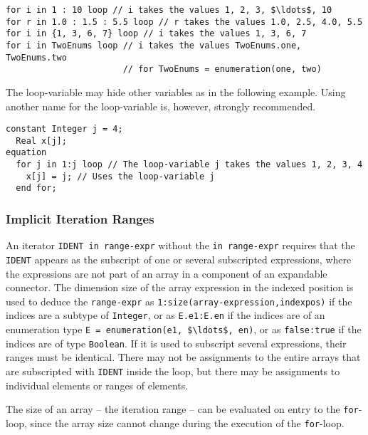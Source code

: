 \begin{example}
\begin{lstlisting}[language=modelica]
for i in 1 : 10 loop // i takes the values 1, 2, 3, $\ldots$, 10
for r in 1.0 : 1.5 : 5.5 loop // r takes the values 1.0, 2.5, 4.0, 5.5
for i in {1, 3, 6, 7} loop // i takes the values 1, 3, 6, 7
for i in TwoEnums loop // i takes the values TwoEnums.one, TwoEnums.two
                       // for TwoEnums = enumeration(one, two)
\end{lstlisting}
The loop-variable may hide other variables as in the following example.
Using another name for the loop-variable is, however, strongly recommended.
\begin{lstlisting}[language=modelica]
  constant Integer j = 4;
  Real x[j];
equation
  for j in 1:j loop // The loop-variable j takes the values 1, 2, 3, 4
    x[j] = j; // Uses the loop-variable j
  end for;
\end{lstlisting}
\end{example}

\subsubsection{Implicit Iteration Ranges}\label{implicit-iteration-ranges}

An iterator \lstinline!IDENT in range-expr! without the \lstinline!in range-expr! requires that the \lstinline!IDENT! appears as the subscript of one or several subscripted expressions, where the expressions are not part of an array in a component of an expandable connector.
The dimension size of the array expression in the indexed position is used to deduce the \lstinline!range-expr! as \lstinline!1:size(array-expression,indexpos)! if the indices are a subtype of \lstinline!Integer!, or as \lstinline!E.e1:E.en! if the indices are of an enumeration type \lstinline!E = enumeration(e1, $\ldots$, en)!, or as \lstinline!false:true! if the indices are of type \lstinline!Boolean!.
If it is used to subscript several expressions, their ranges must be identical.
There may not be assignments to the entire arrays that are subscripted with \lstinline!IDENT! inside the loop, but there may be assignments to individual elements or ranges of elements.

\begin{nonnormative}
The size of an array -- the iteration range -- can be evaluated on entry to the \lstinline!for!-loop, since the array size cannot change during the execution of the \lstinline!for!-loop.
\end{nonnormative}

